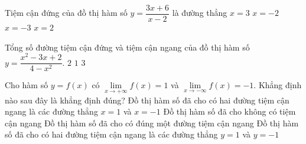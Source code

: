 \begin{ex}%
	Tiệm cận đứng của đồ thị hàm số $y=\dfrac{3x+6}{x-2}$ là đường  thẳng
	\choice 
		 {$x=3$}
		{$x=-2$} 
		 {$x=-3$}
		{\True $x=2$} 
\end{ex}

\begin{ex}%
	Tổng số đường tiệm cận đứng và tiệm cận ngang của đồ thị  hàm số $y=\dfrac{x^{2}-3 x+2}{4-x^2}$.
		 {\True $2$}
		 {$1$}
		 {$3$}
\end{ex}

\begin{ex}%
	Cho hàm số $y=f(x)$ có $\lim\limits_{x  \to +\infty} f(x) = 1$ và $\lim\limits_{x \to -\infty} f(x)=-1$. Khẳng định nào sau đây là khẳng định đúng?
	 \choice
		{Đồ thị hàm số đã cho có hai đường tiệm cận  ngang là các đường thẳng $x=1$ và $x=-1$}
		{Đồ thị hàm số  đã cho không có tiệm cận ngang}
		{Đồ thị hàm số đã cho có đúng  một đường tiệm cận ngang}
		{\True Đồ thị hàm số đã cho có hai đường tiệm cận ngang là  các đường thẳng $y=1$ và $y=-1$}
\end{ex}

